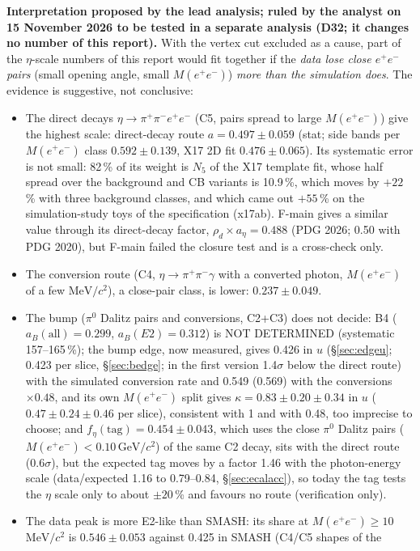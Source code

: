 \documentclass[11pt,a4paper]{article}
\newcommand{\piz}{\ensuremath{\pi^{0}}\xspace}
\newcommand{\ee}{\ensuremath{e^{+}e^{-}}\xspace}
\newcommand{\pipi}{\ensuremath{\pi^{+}\pi^{-}}\xspace}
\newcommand{\ppee}{\ensuremath{\pi^{+}\pi^{-}e^{+}e^{-}}\xspace}
\newcommand{\Mee}{\ensuremath{M(e^{+}e^{-})}\xspace}
\newcommand{\GeVcc}{\ensuremath{\mathrm{GeV}/c^{2}}\xspace}
\newcommand{\MeVcc}{\ensuremath{\mathrm{MeV}/c^{2}}\xspace}
\newcommand{\aEta}{\ensuremath{a_\eta}\xspace}
\newcommand{\rhod}{\ensuremath{\rho_d}\xspace}
\newcommand{\notebox}[1]{\par\noindent\colorbox{orange!10}{\parbox{\dimexpr\linewidth-2\fboxsep\relax}{#1}}\par}
\begin{document}
\notebox{\textbf{Interpretation proposed by the lead analysis; ruled by the analyst on 15 November 2026 to be tested in a separate analysis
(D32; it changes no number of this report).} With the vertex cut excluded as a cause,
part of the $\eta$-scale numbers of this report would fit together if the \emph{data lose close \ee pairs} (small opening angle, small \Mee)
\emph{more than the simulation does}. The evidence is suggestive, not conclusive:
\begin{itemize}\setlength{\itemsep}{0pt}
\item The direct decays $\eta\to\ppee$ (C5, pairs spread to large \Mee) give the highest scale: direct-decay route $a=0.497\pm0.059$ (stat; side
      bands per \Mee class $0.592\pm0.139$, X17 2D fit $0.476\pm0.065$). Its systematic error is not small: 82\,\% of its weight is $N_5$ of the X17
      template fit, whose half spread over the background and CB variants is 10.9\,\%, which moves by $+22$\,\% with three background classes, and
      which came out $+55$\,\% on the simulation-study toys of the specification (x17ab). F-main gives a similar value through its direct-decay
      factor, $\rhod\times\aEta=0.488$ (PDG 2026; 0.50 with PDG 2020), but F-main failed the closure test and is a cross-check only.
\item The conversion route (C4, $\eta\to\pipi\gamma$ with a converted photon, \Mee of a few \MeVcc), a close-pair class, is lower: $0.237\pm0.049$.
\item The bump (\piz Dalitz pairs and conversions, C2+C3) does not decide: B4 ($a_B(\mathrm{all})=0.299$, $a_B(E2)=0.312$) is NOT DETERMINED
      (systematic 157--165\,\%); the bump edge, now measured, gives 0.426 in $u$ (\S\ref{sec:edgeu}; 0.423 per slice, \S\ref{sec:bedge}; in the
      first version 1.4$\sigma$ below the direct route) with the simulated conversion rate and 0.549 (0.569) with the conversions $\times0.48$, and
      its own \Mee split gives $\kappa=0.83\pm0.20\pm0.34$ in $u$ ($0.47\pm0.24\pm0.46$ per slice), consistent with 1 and with 0.48, too imprecise
      to choose; and $f_\eta(\mathrm{tag})=0.454\pm0.043$, which uses the close \piz Dalitz pairs ($\Mee<0.10$\,\GeVcc) of the same C2 decay, sits
      with the direct route (0.6$\sigma$), but the expected tag moves by a factor 1.46 with the photon-energy scale (data/expected 1.16 to
      0.79--0.84, \S\ref{sec:ecalacc}), so today the tag tests the $\eta$ scale only to about $\pm20$\,\% and favours no route (verification only).
\item The data peak is more E2-like than SMASH: its share at \Mee$\ge10$\,\MeVcc is $0.546\pm0.053$ against 0.425 in SMASH (C4/C5 shapes of the

\end{itemize}}
\end{document}
